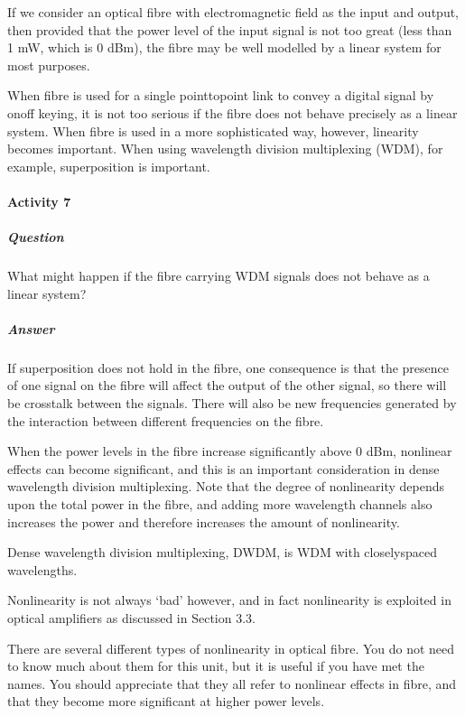 \documentclass[letterpaper,10pt,english]{sphinxmanual}
\begin{document}
If we consider an optical fibre with electromagnetic field as the input and output, then provided that the power level of the input signal is not too great (less than 1 mW, which is 0 dBm), the fibre may be well modelled by a linear system for most purposes.

When fibre is used for a single point\sphinxhyphen{}to\sphinxhyphen{}point link to convey a digital signal by on\sphinxhyphen{}off keying, it is not too serious if the fibre does not behave precisely as a linear system. When fibre is used in a more sophisticated way, however, linearity becomes important. When using wavelength division multiplexing (WDM), for example, superposition is important.


\paragraph{Activity 7}
\label{\detokenize{content/session_00/Part_00_02:Activity-7}}

\subparagraph{Question}
\label{\detokenize{content/session_00/Part_00_02:id21}}
What might happen if the fibre carrying WDM signals does not behave as a linear system?


\subparagraph{Answer}
\label{\detokenize{content/session_00/Part_00_02:id22}}
If superposition does not hold in the fibre, one consequence is that the presence of one signal on the fibre will affect the output of the other signal, so there will be crosstalk between the signals. There will also be new frequencies generated by the interaction between different frequencies on the fibre.

When the power levels in the fibre increase significantly above 0 dBm, nonlinear effects can become significant, and this is an important consideration in dense wavelength division multiplexing. Note that the degree of non\sphinxhyphen{}linearity depends upon the total power in the fibre, and adding more wavelength channels also increases the power and therefore increases the amount of non\sphinxhyphen{}linearity.

Dense wavelength division multiplexing, DWDM, is WDM with closely\sphinxhyphen{}spaced wavelengths.

Non\sphinxhyphen{}linearity is not always ‘bad’ however, and in fact non\sphinxhyphen{}linearity is exploited in optical amplifiers as discussed in Section 3.3.

There are several different types of non\sphinxhyphen{}linearity in optical fibre. You do not need to know much about them for this unit, but it is useful if you have met the names. You should appreciate that they all refer to non\sphinxhyphen{}linear effects in fibre, and that they become more significant at higher power levels.
\end{document}
